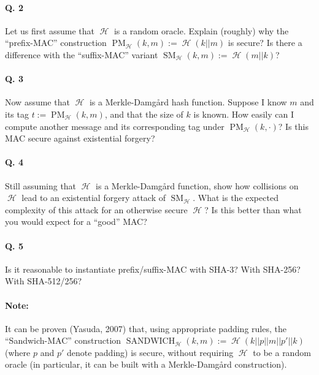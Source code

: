 \documentclass[11pt,a4paper]{article}
\DeclareMathOperator\hash{\mathcal{H}}
\DeclareMathOperator\pmm{\mathrm{PM}}
\DeclareMathOperator\smm{\mathrm{SM}}
\DeclareMathOperator\sand{\mathrm{SANDWICH}}
\begin{document}
\paragraph{Q. 2} Let us first assume that $\hash$ is a random oracle. Explain (roughly) why the ``prefix-MAC'' construction
$\pmm_{\hash}(k, m) := \hash(k||m)$ is secure? Is there a difference with the ``suffix-MAC'' variant $\smm_{\hash}(k, m) := \hash(m||k)$?

\paragraph{Q. 3} Now assume that $\hash$ is a Merkle-Damg\aa rd hash function. Suppose I know $m$ and its tag $t := \pmm_{\hash}(k, m)$,
and that the size of $k$ is known. How easily can I compute another message and its corresponding tag under $\pmm_{\hash}(k, \cdot)$? Is this
MAC secure against existential forgery?

\paragraph{Q. 4} Still assuming that $\hash$ is a Merkle-Damg\aa rd function, show how collisions on $\hash$ lead to an existential forgery attack
of $\smm_{\hash}$. What is the expected complexity of this attack for an otherwise secure $\hash$? Is this better than what you would expect for a ``good'' MAC?

\paragraph{Q. 5} Is it reasonable to instantiate prefix/suffix-MAC with SHA-3? With SHA-256? With SHA-512/256?

\paragraph{Note:} It can be proven (Yasuda, 2007) that, using appropriate padding rules, the ``Sandwich-MAC'' construction $\sand_{\hash}(k,m) := \hash(k||p||m||p'||k)$
(where $p$ and $p'$ denote padding) is secure, without requiring $\hash$ to be a random oracle (in particular, it can be built with a Merkle-Damg\aa rd construction).
\end{document}
